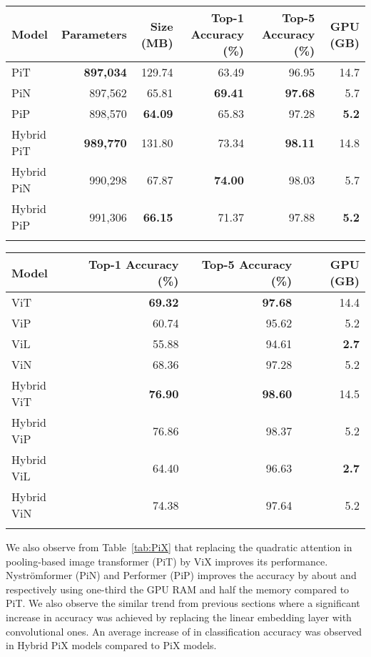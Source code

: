 \documentclass{article}
\begin{document}
\begin{table*}[h]
\centering
\begin{tabular}{lrrrrr}
\hline
\textbf{Model} & \textbf{Parameters} & \textbf{Size (MB)} & \textbf{Top-1 Accuracy (\%)} & \textbf{Top-5 Accuracy (\%)} & \textbf{GPU (GB)} \\ \hline
PiT & \textbf{897,034} & 129.74 & 63.49 & 96.95 & 14.7 \\
PiN & 897,562 & 65.81 & \textbf{69.41} & \textbf{97.68} & 5.7 \\
PiP & 898,570 & \textbf{64.09} & 65.83 & 97.28 & \textbf{5.2} \\ \hline
Hybrid PiT & \textbf{989,770} & 131.80 & 73.34 & \textbf{98.11} & 14.8 \\
Hybrid PiN &  990,298 & 67.87 & \textbf{74.00} & 98.03 & 5.7 \\
Hybrid PiP & 991,306 & \textbf{66.15} & 71.37 & 97.88 & \textbf{5.2} \\ \hline \\
\end{tabular}\caption{Comparison of performance by replacing attention with X-formers in PiT for classification of CIFAR-10 dataset}
\label{tab:PiX}
\end{table*}
\begin{table*}[h]
\centering

\begin{tabular}{lrrr}
\hline
\textbf{Model}  & \textbf{Top-1 Accuracy (\%)} & \textbf{Top-5 Accuracy (\%)} & \textbf{GPU (GB)}\\ \hline
ViT & \textbf{69.32} & \textbf{97.68} & 14.4 \\
ViP &  60.74 & 95.62 & 5.2 \\
ViL & 55.88 & 94.61 & \textbf{2.7} \\
ViN & 68.36 & 97.28 & 5.2 \\ \hline
Hybrid ViT & \textbf{76.90} & \textbf{98.60} & 14.5 \\
Hybrid ViP & 76.86 & 98.37 & 5.2 \\
Hybrid ViL & 64.40 & 96.63 & \textbf{2.7} \\
Hybrid ViN & 74.38 & 97.64 & 5.2 \\ \hline \\
\end{tabular}\caption{Performance of ViX and Hybrid ViX models using Rotary Position Embedding on CIFAR-10 dataset}
\label{tab:RoPE}
\end{table*}

 
We also observe from Table~\ref{tab:PiX} that replacing the quadratic attention in pooling-based image transformer (PiT) by ViX improves its performance. Nyströmformer (PiN) and Performer (PiP) improves the accuracy by about  and  respectively using one-third the GPU RAM and half the memory compared to PiT. We also observe the similar trend from previous sections where a significant increase in accuracy was achieved by replacing the linear embedding layer with convolutional ones. An average increase of  in classification accuracy was observed in Hybrid PiX models compared to PiX models.
\end{document}
